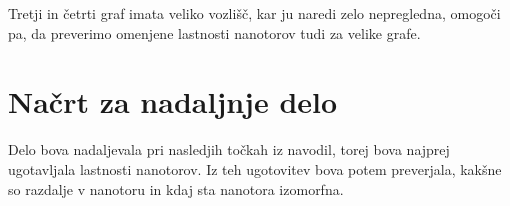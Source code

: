 \documentclass[a4paper, 11 pt]{article}
\begin{document}
Tretji in četrti graf imata veliko vozlišč, kar ju naredi zelo nepregledna, omogoči pa, da preverimo omenjene lastnosti nanotorov tudi za velike grafe.






\section{Načrt za nadaljnje delo}

Delo bova nadaljevala pri nasledjih točkah iz navodil, torej bova najprej ugotavljala lastnosti nanotorov. Iz teh ugotovitev bova potem preverjala, kakšne so razdalje v nanotoru in kdaj sta nanotora izomorfna.
\end{document}
